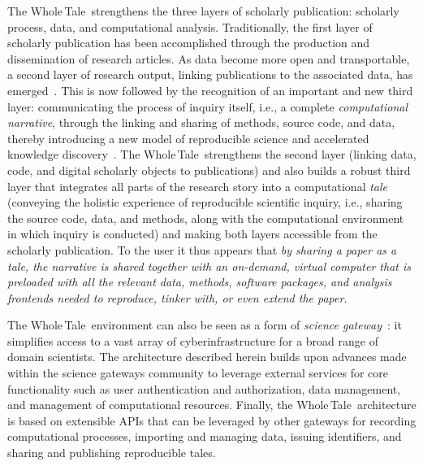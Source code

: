 \documentclass[review]{elsarticle}
\newcommand{\wt}{Whole\,Tale}
\begin{document}
The \wt\ strengthens the three layers of scholarly publication: scholarly process, data, 
and computational analysis. Traditionally, the first layer of scholarly publication has been accomplished 
through the production and dissemination of research articles. As data become more open and transportable, a 
second layer of research output, linking publications to the associated data, has emerged~\cite{kratz14datapub}. This is now  followed by the recognition of an important and new third layer: communicating the process of inquiry itself, 
i.e., a complete \emph{computational narrative}, through the linking and sharing of methods, source code, and data, 
thereby introducing a new model of reproducible science and accelerated knowledge discovery~\cite{Stodden1240}. The \wt\ strengthens the second layer (linking data, code, and digital scholarly objects to publications) and also builds
a robust third layer that integrates all parts of the research story into a computational \emph{tale} (conveying the holistic experience of reproducible scientific inquiry, i.e., sharing the source code, data, and methods, along with the computational environment in which inquiry is conducted) and making both layers accessible from the scholarly publication. To the user it thus appears that \emph{by sharing a paper as a tale, the narrative is shared together with an on-demand, virtual computer that is preloaded with all the relevant data, methods, software packages, and analysis frontends needed to reproduce, tinker with, or even extend the paper}. 


The \wt\ environment can also be seen as a form of \emph{science gateway}~\cite{wilkins07gateways}: it 
simplifies access to a vast array of cyberinfrastructure for a broad range of domain scientists. The architecture
described herein builds upon advances made within the science gateways community to leverage external
services for core functionality such as user authentication and authorization, data management, and 
 management of computational resources. Finally, the \wt\ architecture is based on extensible APIs that 
can be leveraged by other gateways for recording computational processes, importing 
and managing data, issuing identifiers, and sharing and publishing reproducible tales.
\end{document}
